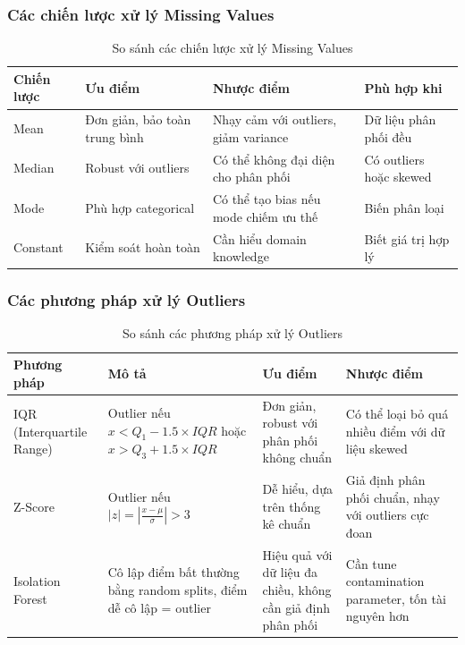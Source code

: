 \documentclass[12pt,a4paper]{article}
\begin{document}
\subsubsection{Các chiến lược xử lý Missing Values}

\begin{table}[H]
\centering
\caption{So sánh các chiến lược xử lý Missing Values}
\label{tab:missing_strategies}
\begin{tabular}{|l|p{4cm}|p{4cm}|p{3cm}|}
\hline
\textbf{Chiến lược} & \textbf{Ưu điểm} & \textbf{Nhược điểm} & \textbf{Phù hợp khi} \\
\hline
Mean & Đơn giản, bảo toàn trung bình & Nhạy cảm với outliers, giảm variance & Dữ liệu phân phối đều \\
\hline
Median & Robust với outliers & Có thể không đại diện cho phân phối & Có outliers hoặc skewed \\
\hline
Mode & Phù hợp categorical & Có thể tạo bias nếu mode chiếm ưu thế & Biến phân loại \\
\hline
Constant & Kiểm soát hoàn toàn & Cần hiểu domain knowledge & Biết giá trị hợp lý \\
\hline
\end{tabular}
\end{table}

\subsubsection{Các phương pháp xử lý Outliers}

\begin{table}[H]
\centering
\caption{So sánh các phương pháp xử lý Outliers}
\label{tab:outlier_methods}
\begin{tabular}{|l|p{3.5cm}|p{3.5cm}|p{3.5cm}|}
\hline
\textbf{Phương pháp} & \textbf{Mô tả} & \textbf{Ưu điểm} & \textbf{Nhược điểm} \\
\hline
IQR (Interquartile Range) & Outlier nếu $x < Q_1 - 1.5 \times IQR$ hoặc $x > Q_3 + 1.5 \times IQR$ & Đơn giản, robust với phân phối không chuẩn & Có thể loại bỏ quá nhiều điểm với dữ liệu skewed \\
\hline
Z-Score & Outlier nếu $|z| = \left|\frac{x - \mu}{\sigma}\right| > 3$ & Dễ hiểu, dựa trên thống kê chuẩn & Giả định phân phối chuẩn, nhạy với outliers cực đoan \\
\hline
Isolation Forest & Cô lập điểm bất thường bằng random splits, điểm dễ cô lập = outlier & Hiệu quả với dữ liệu đa chiều, không cần giả định phân phối & Cần tune contamination parameter, tốn tài nguyên hơn \\
\hline
\end{tabular}
\end{table}
\end{document}
